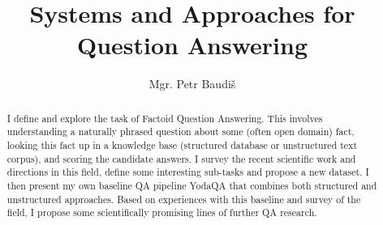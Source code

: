 \documentclass[11pt,a4paper,notitlepage]{report}
\title{Systems and Approaches for Question Answering}
\author{Mgr. Petr Baudiš}
\begin{document}
\maketitle

\begin{abstract}%
	I define and explore the task of Factoid Question Answering.
	This involves understanding a naturally phrased question
	about some (often open domain) fact, looking this fact up
	in a knowledge base (structured database or unstructured
	text corpus), and scoring the candidate answers.
	I survey the recent scientific work and directions in this
	field, define some interesting sub-tasks and propose a new dataset.
	I then present my own baseline QA pipeline YodaQA that
	combines both structured and unstructured approaches.
	Based on experiences with this baseline and survey of the
	field, I propose some scientifically promising lines of further
	QA research.
\end{abstract}


\tableofcontents







\appendix

%



\end{document}
